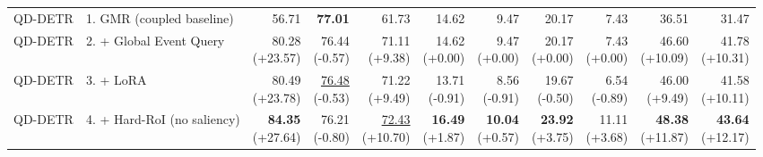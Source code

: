 \documentclass{article}
\begin{document}
{\begin{tabular}{llrrrrrrrrr}
\midrule
QD-DETR & 1. GMR (coupled baseline) & 56.71 & \textbf{77.01} & 61.73 & 14.62 & 9.47 & 20.17 & 7.43 & 36.51 & 31.47 \\
QD-DETR & 2. + Global Event Query & \shortstack{80.28 \\ {\scriptsize (+23.57)}} & \shortstack{76.44 \\ {\scriptsize (-0.57)}} & \shortstack{71.11 \\ {\scriptsize (+9.38)}} & \shortstack{14.62 \\ {\scriptsize (+0.00)}} & \shortstack{9.47 \\ {\scriptsize (+0.00)}} & \shortstack{20.17 \\ {\scriptsize (+0.00)}} & \shortstack{7.43 \\ {\scriptsize (+0.00)}} & \shortstack{46.60 \\ {\scriptsize (+10.09)}} & \shortstack{41.78 \\ {\scriptsize (+10.31)}} \\
QD-DETR & 3. + LoRA & \shortstack{80.49 \\ {\scriptsize (+23.78)}} & \shortstack{\underline{76.48} \\ {\scriptsize (-0.53)}} & \shortstack{71.22 \\ {\scriptsize (+9.49)}} & \shortstack{13.71 \\ {\scriptsize (-0.91)}} & \shortstack{8.56 \\ {\scriptsize (-0.91)}} & \shortstack{19.67 \\ {\scriptsize (-0.50)}} & \shortstack{6.54 \\ {\scriptsize (-0.89)}} & \shortstack{46.00 \\ {\scriptsize (+9.49)}} & \shortstack{41.58 \\ {\scriptsize (+10.11)}} \\
QD-DETR & 4. + Hard-RoI (no saliency) & \shortstack{\textbf{84.35} \\ {\scriptsize (+27.64)}} & \shortstack{76.21 \\ {\scriptsize (-0.80)}} & \shortstack{\underline{72.43} \\ {\scriptsize (+10.70)}} & \shortstack{\textbf{16.49} \\ {\scriptsize (+1.87)}} & \shortstack{\textbf{10.04} \\ {\scriptsize (+0.57)}} & \shortstack{\textbf{23.92} \\ {\scriptsize (+3.75)}} & \shortstack{11.11 \\ {\scriptsize (+3.68)}} & \shortstack{\textbf{48.38} \\ {\scriptsize (+11.87)}} & \shortstack{\textbf{43.64} \\ {\scriptsize (+12.17)}} \\

\end{tabular}}
\end{document}
